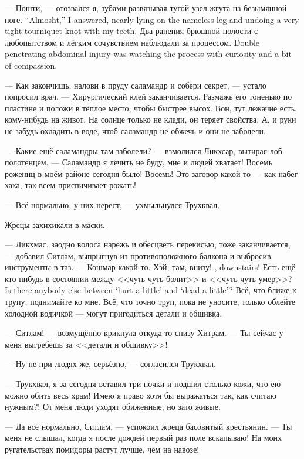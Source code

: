 {--- Пошти, --- отозвался я, зубами развязывая тугой узел жгута на безымянной ноге.}
{``Almosht,'' I answered, nearly lying on the nameless leg and undoing a very tight tourniquet knot with my teeth.}
{Два ранения брюшной полости с любопытством и лёгким сочувствием наблюдали за процессом.}
{Double penetrating abdominal injury was watching the process with curiosity and a bit of compassion.}

--- Как закончишь, налови в пруду саламандр и собери секрет, --- устало попросил врач.
--- Хирургический клей заканчивается.
Размажь его тоненько по пластине и положи в тёплое место, чтобы быстрее высох.
Вон, тут лежачие есть, кому-нибудь на живот.
На солнце только не клади, он теряет свойства.
А, и руки не забудь охладить в воде, чтоб саламандр не обжечь и они не заболели.

--- Какие ещё саламандры там заболели? --- взмолился Ликхсар, вытирая лоб полотенцем.
--- Саламандр я лечить не буду, мне и людей хватает!
Восемь рожениц в моём районе сегодня было!
Восемь!
Это заговор какой-то --- как набег хака, так всем приспичивает рожать!

--- Всё нормально, у них нерест, --- ухмыльнулся Трухквал.

Жрецы захихикали в маски.

--- Ликхмас, заодно волоса нарежь и обесцветь перекисью, тоже заканчивается, --- добавил Ситлам, выпрыгнув из противоположного балкона и выбросив инструменты в таз.
--- Кошмар какой-то.
{Хэй, там, внизу!}
{\Hei, downstairs!}
{Есть ещё кто-нибудь в состоянии между <<чуть-чуть болит>> и <<чуть-чуть умер>>?}
{Is there anybody else between `hurt a little' and `dead a little'?}
Всё, что ближе к трупу, поднимайте ко мне.
Всё, что точно труп, пока не уносите, только облейте холодной водичкой --- могут пригодиться детали и обшивка.

--- Ситлам! --- возмущённо крикнула откуда-то снизу Хитрам.
--- Ты сейчас у меня выгребешь за <<детали и обшивку>>!

--- Ну не при людях же, серьёзно, --- согласился Трукхвал.

--- Трукхвал, я за сегодня вставил три почки и подшил столько кожи, что ею можно обить весь храм!
Имею я право хотя бы выражаться так, как считаю нужным?!
От меня люди уходят обиженные, но зато живые.

--- Да всё нормально, Ситлам, --- успокоил жреца басовитый крестьянин.
--- Ты меня не слышал, когда я после дождей первый раз поле вскапываю!
На моих ругательствах помидоры растут лучше, чем на навозе!

